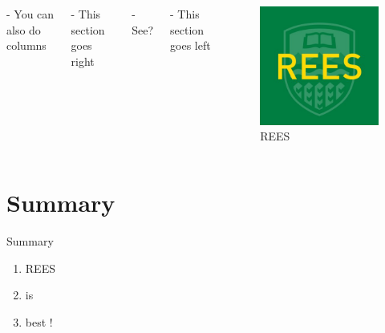 \documentclass[
  9pt,
  ignorenonframetext,
  compress]{beamer}
\begin{document}
\begin{frame}{}
\protect\hypertarget{section}{}
\begin{columns}
- You can also do columns \par
- This section goes right \par
- See? 

\begin{center} - This section goes left \par
\end{center}
\begin{figure}

{\centering \includegraphics[width=0.75\linewidth,height=0.5\textheight]{LO7Pg0M-_400x400} 

}

\caption{REES}\label{fig:unnamed-chunk-3}
\end{figure}

 \end{columns}
\end{frame}

\hypertarget{summary}{%
\section{Summary}\label{summary}}

\begin{frame}{Summary}
\begin{enumerate}[<+->]
\item
  REES
\item
  is
\item
  best !
\end{enumerate}
\end{frame}
\end{document}

